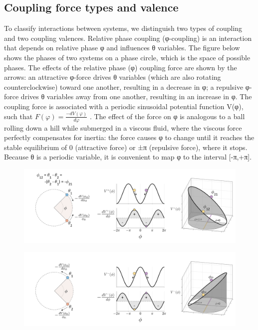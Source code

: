 \subsection{Coupling force types and valence} 

To classify interactions between systems, we distinguish two types of coupling and two coupling valences. Relative phase coupling (φ-coupling) is an interaction that depends on relative phase φ and influences θ variables. The figure below shows the phases of two systems on a phase circle, which is the space of possible phases. The effects of the relative phase (φ) coupling force are shown by the arrows: an attractive φ-force drives θ variables (which are also rotating counterclockwise) toward one another, resulting in a decrease in φ; a repulsive φ-force drives θ variables away from one another, resulting in an increase in φ. The coupling force is associated with a periodic sinusoidal potential function V(φ), such that  $F\left(\varphi \right)=\frac{-\mathit{dV}\left(\varphi \right)}{\mathit{d\varphi} }$ . The effect of the force on φ is analogous to a ball rolling down a hill while submerged in a viscous fluid, where the viscous force perfectly compensates for inertia: the force causes φ to change until it reaches the stable equilibrium of 0 (attractive force) or ±π (repulsive force), where it stops. Because θ is a periodic variable, it is convenient to map φ to the interval [-π,+π]. 

  
\begin{figure}
\includegraphics[width=\textwidth]{figures/Tilsen-img18.png}
\caption{\missingcaption}
\label{fig:}
\end{figure}
 

  
\begin{figure}
\includegraphics[width=\textwidth]{figures/Tilsen-img19.png}
\caption{\missingcaption}
\label{fig:}
\end{figure}
 

